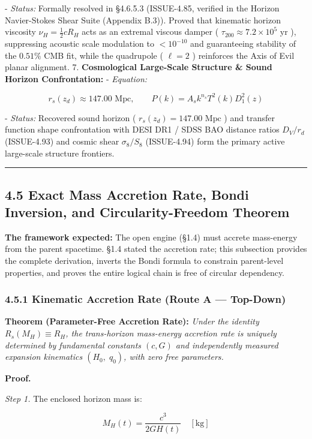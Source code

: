 \documentclass[11pt,a4paper]{article}
\theoremstyle{definition}\newtheorem{definition}{Definition}
\theoremstyle{remark}\newtheorem{remark}{Remark}
\begin{document}
- \textit{Status:} Formally resolved in §4.6.5.3 (ISSUE-4.85, verified in the Horizon Navier-Stokes Shear Suite (Appendix B.3)). Proved that kinematic horizon viscosity $\nu_H = \frac{1}{2} c R_H$ acts as an extremal viscous damper ( $\tau_{200} \approx 7.2 \times 10^5\text{ yr}$ ), suppressing acoustic scale modulation to $< 10^{-10}$ and guaranteeing stability of the $0.51\%$ CMB fit, while the quadrupole ( $\ell = 2$ ) reinforces the Axis of Evil planar alignment.
7. \textbf{Cosmological Large-Scale Structure \& Sound Horizon Confrontation:}
- \textit{Equation:}


\begin{equation}
r_s(z_d) \approx 147.00\text{ Mpc}, \qquad P(k) = A_s k^{n_s} T^2(k) D_1^2(z)
\end{equation}


- \textit{Status:} Recovered sound horizon ( $r_s(z_d) = 147.00\text{ Mpc}$ ) and transfer function shape confrontation with DESI DR1 / SDSS BAO distance ratios $D_V/r_d$ (ISSUE-4.93) and cosmic shear $\sigma_8 / S_8$ (ISSUE-4.94) form the primary active large-scale structure frontiers.

\noindent\rule{\linewidth}{0.4pt}
\subsection{4.5 Exact Mass Accretion Rate, Bondi Inversion, and Circularity-Freedom Theorem}

\textbf{The framework expected:} The open engine (§1.4) must accrete mass-energy from the parent spacetime. §1.4 stated the accretion rate; this subsection provides the complete derivation, inverts the Bondi formula to constrain parent-level properties, and proves the entire logical chain is free of circular dependency.
\subsubsection{4.5.1 Kinematic Accretion Rate (Route A — Top-Down)}

\textbf{Theorem (Parameter-Free Accretion Rate):} \textit{Under the identity $R_s(M_H) \equiv R_H$, the trans-horizon mass-energy accretion rate is uniquely determined by fundamental constants $(c, G)$ and independently measured expansion kinematics $(H_0, \; q_0)$, with zero free parameters.}

\textbf{Proof.}

\textit{Step 1.} The enclosed horizon mass is:


\begin{equation}
M_H(t) = \frac{c^3}{2 G H(t)} \quad [\mathrm{kg}]
\end{equation}
\end{document}
